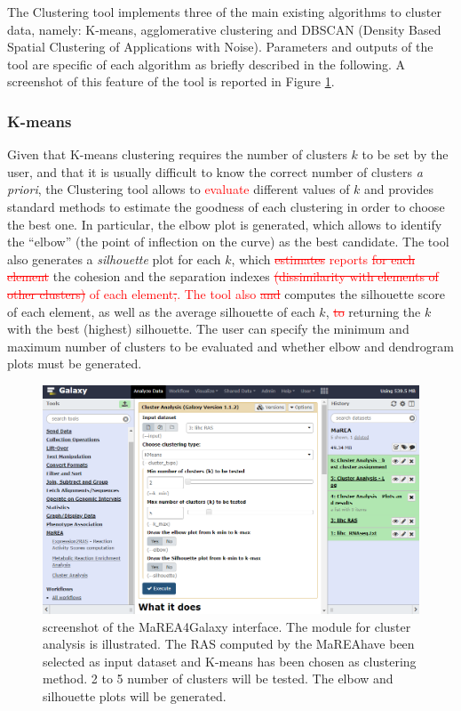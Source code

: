 \documentclass[preprint,12pt,authoryear]{elsarticle}
\newcommand{\red}{\textcolor{red}}
\newcommand{\mareagalaxy}{\textsf{MaREA4Galaxy}}
\newcommand{\mareaTool}{\textsf{MaREA}}
\newcommand{\clusterTool}{\textsf{Clustering}}
\begin{document}
The \clusterTool{} tool implements three of the main existing algorithms
to cluster data, namely: K-means, agglomerative clustering and DBSCAN
(Density Based Spatial Clustering of Applications with
Noise). Parameters and outputs of the tool are specific of each
algorithm as briefly described in the following.  A screenshot of this
feature of the tool is reported in Figure \ref{fig:screenshot2}.


\subsubsection{K-means}

Given that K-means clustering requires the number of clusters $k$ to
be set by the user, and that it is usually difficult to know the
correct number of clusters \textit{a priori}, the \clusterTool{} tool
allows to \red{evaluate} different values of $k$ and provides standard
methods to estimate the goodness of each clustering in order to choose
the best one. In particular, the elbow plot is generated, which allows
to identify the ``elbow'' (the point of inflection on the curve) as
the best candidate. The tool also generates a \emph{silhouette} plot
for each $k$, which \red{\sout{estimates} reports} \red{\sout{for each
    element}} the cohesion and the separation indexes
\red{\sout{(dissimilarity with elements of other clusters)} of each
  element}\red{\sout{,}. The tool also \sout{and}} computes the
silhouette score of each element, as well as the average silhouette of
each $k$, \red{\sout{to}} returning the $k$ with the best (highest)
silhouette.  The user can specify the minimum and maximum number of
clusters to be evaluated and whether elbow and dendrogram plots must
be generated.

\begin{figure}[ht]
  \includegraphics[width=1\textwidth]{figs/screenshot2v2q.png}
  \caption{screenshot of the \mareagalaxy{} interface. The module for
    cluster analysis is illustrated. The RAS computed  by the
    \mareaTool have been selected as input dataset and K-means has
    been chosen as clustering method. 2 to 5 number of clusters will
    be tested. The elbow and silhouette plots will be generated.}
  \label{fig:screenshot2}
\end{figure}
\end{document}
